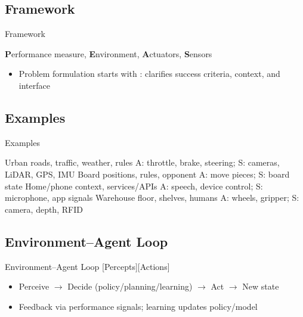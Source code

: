 \documentclass[aspectratio=169]{beamer}
\begin{document}
\subsection{\PEAS{} Framework}
\begin{frame}{\PEAS{} Framework}
\begin{block}{\PEAS}
\textbf{P}erformance measure, \textbf{E}nvironment, \textbf{A}ctuators, \textbf{S}ensors
\end{block}
\begin{itemize}
  \item Problem formulation starts with \PEAS{}: clarifies success criteria, context, and interface
\end{itemize}
\end{frame}

\subsection{\PEAS{} Examples}
\begin{frame}{\PEAS{} Examples}
\begin{PEASTable}
  \PEASHeader
          {Urban roads, traffic, weather, rules}
          {A: throttle, brake, steering; S: cameras, LiDAR, GPS, IMU}
          {Board positions, rules, opponent}
          {A: move pieces; S: board state}
          {Home/phone context, services/APIs}
          {A: speech, device control; S: microphone, app signals}
          {Warehouse floor, shelves, humans}
          {A: wheels, gripper; S: camera, depth, RFID}
  \PEASBottom
\end{PEASTable}
\end{frame}

\subsection{Environment–Agent Loop}
\begin{frame}{Environment–Agent Loop}
\centering
{}[Percepts][Actions]
\bigskip

\begin{itemize}
  \item Perceive $\rightarrow$ Decide (policy/planning/learning) $\rightarrow$ Act $\rightarrow$ New state
  \item Feedback via performance signals; learning updates policy/model
\end{itemize}
\end{frame}
\end{document}
